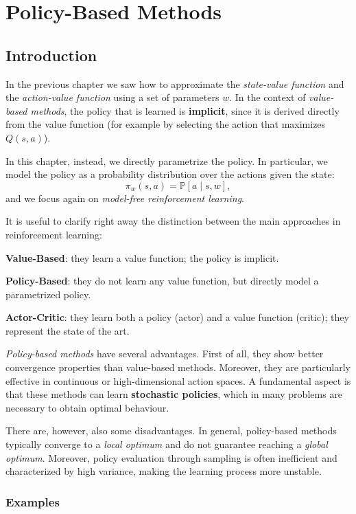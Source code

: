 \chapter{Policy-Based Methods}
\section{Introduction}
In the previous chapter we saw how to approximate the \emph{state-value function} and the \emph{action-value function} using a set of parameters $w$. In the context of \emph{value-based methods}, the policy that is learned is \textbf{implicit}, since it is derived directly from the value function (for example by selecting the action that maximizes $Q(s,a)$).

In this chapter, instead, we directly parametrize the policy. In particular, we model the policy as a probability distribution over the actions given the state:
\[
\pi_w(s,a) = \mathbb{P}[a \mid s,w],
\]
and we focus again on \emph{model-free reinforcement learning}.

It is useful to clarify right away the distinction between the main approaches in reinforcement learning:
\begin{compactitemize}
    \item \textbf{Value-Based}: they learn a value function; the policy is implicit.
    \item \textbf{Policy-Based}: they do not learn any value function, but directly model a parametrized policy.
    \item \textbf{Actor-Critic}: they learn both a policy (actor) and a value function (critic); they represent the state of the art.
\end{compactitemize}

\emph{Policy-based methods} have several advantages. First of all, they show better convergence properties than value-based methods. Moreover, they are particularly effective in continuous or high-dimensional action spaces. A fundamental aspect is that these methods can learn \textbf{stochastic policies}, which in many problems are necessary to obtain optimal behaviour.

There are, however, also some disadvantages. In general, policy-based methods typically converge to a \emph{local optimum} and do not guarantee reaching a \emph{global optimum}. Moreover, policy evaluation through sampling is often inefficient and characterized by high variance, making the learning process more unstable.
\subsection{Examples}
